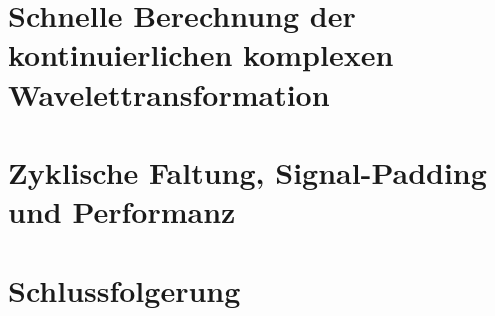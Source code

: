 \begin{refsection}

\section{Schnelle Berechnung der kontinuierlichen komplexen Wavelettransformation}


\section{Zyklische Faltung, Signal-Padding und Performanz}

\section{Schlussfolgerung}

\printbibliography[heading=subbibliography]
\end{refsection}
